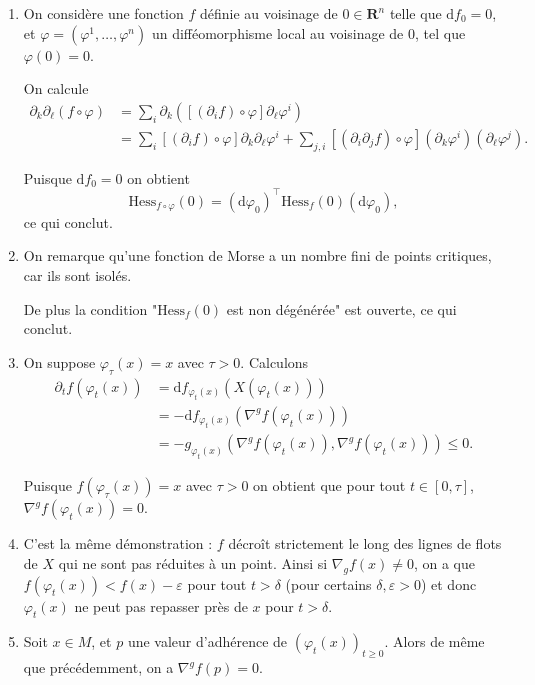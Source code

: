 \documentclass[a4paper,12pt,openany]{article}
\theoremstyle{plain}
\theoremstyle{definition}
\newcommand{\dd}{\mathrm{d}}
\newcommand{\R}{\mathbf{R}}
\begin{document}
\begin{enumerate}
\item On consid\`ere une fonction $f$ d\'efinie au voisinage de $0 \in \R^n$ telle que $\dd f_0 = 0$, et $\varphi = (\varphi^1, \dots, \varphi^n)$  un diff\'eomorphisme local au voisinage de $0$, tel que $\varphi(0) = 0$.

 


On calcule
$$
\begin{aligned}
\partial_k \partial_\ell (f\circ \varphi) &= \sum_{i} \partial_k\left([(\partial_i f) \circ \varphi] \partial_\ell \varphi^i \right) \\
&= \sum_{i} [(\partial_if) \circ \varphi] \partial _k \partial_\ell \varphi^i + \sum_{j,i} [(\partial_i \partial_j f) \circ \varphi] (\partial_k \varphi^i)(\partial_\ell \varphi^j).
\end{aligned}
$$

 


Puisque $\dd f_0 = 0$ on obtient
$$
\mathrm{Hess}_{f\circ \varphi}(0) = (\dd \varphi_0)^{\top} \mathrm{Hess}_f(0) (\dd \varphi_0),
$$
ce qui conclut.
\item On remarque qu'une fonction de Morse a un nombre fini de points critiques, car ils sont isol\'es. 

De plus la condition "$\mathrm{Hess}_f(0)$ est non d\'eg\'en\'er\'ee" est ouverte, ce qui conclut.

\item On suppose $\varphi_{\tau}(x) = x$ avec $\tau > 0$. Calculons 
$$
\begin{aligned}
\partial_t f(\varphi_t(x)) &= \dd f_{\varphi_t(x)}(X(\varphi_t(x))) \\
&= - \dd f_{\varphi_t(x)}(\nabla^g f(\varphi_t(x)))  \\
&= -g_{\varphi_t(x)}(\nabla^g f(\varphi_t(x)), \nabla^g f(\varphi_t(x))) \leqslant 0.
\end{aligned}
$$

 


Puisque $f(\varphi_\tau(x)) = x$ avec $\tau > 0$ on obtient que pour tout $t \in [0, \tau]$, $\nabla^g f(\varphi_t(x)) = 0$. 
\item C'est la m\^eme d\'emonstration : $f$ d\'ecro\^it strictement le long des lignes de flots de $X$ qui ne sont pas r\'eduites \`a un point. Ainsi si $\nabla_gf(x) \neq 0$, on a que $f(\varphi_t(x)) < f(x) - \varepsilon$ pour tout $t > \delta$ (pour certains $\delta, \varepsilon > 0$) et donc $\varphi_t(x)$ ne peut pas repasser pr\`es de $x$ pour $t > \delta$.
\item Soit $x \in M$, et $p$ une valeur d'adh\'erence de $(\varphi_t(x))_{t \geqslant 0}.$ Alors de m\^eme que pr\'ec\'edemment, on a $\nabla^g f(p) = 0.$ 


\end{enumerate}
\end{document}
